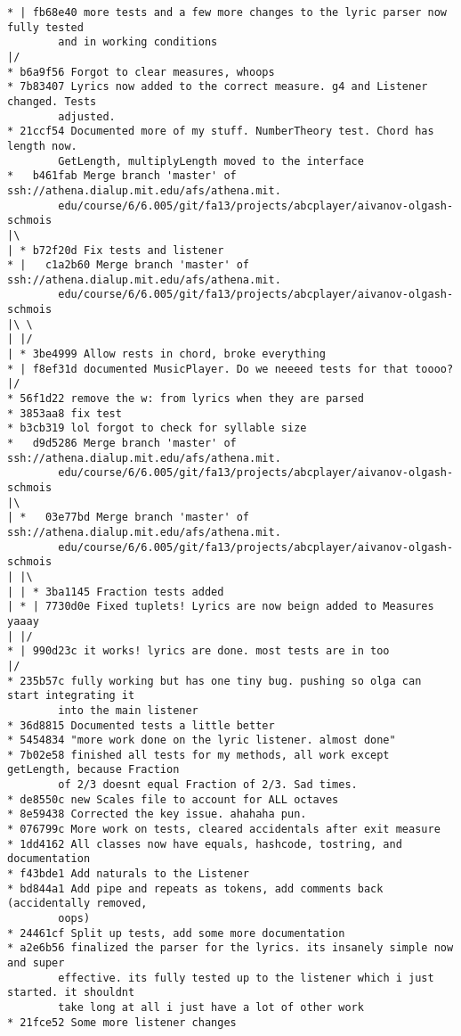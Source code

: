 \documentclass[12pt]{book}
\begin{document}
\begin{Verbatim}
* | fb68e40 more tests and a few more changes to the lyric parser now fully tested 
        and in working conditions
|/
* b6a9f56 Forgot to clear measures, whoops
* 7b83407 Lyrics now added to the correct measure. g4 and Listener changed. Tests 
        adjusted.
* 21ccf54 Documented more of my stuff. NumberTheory test. Chord has length now. 
        GetLength, multiplyLength moved to the interface
*   b461fab Merge branch 'master' of ssh://athena.dialup.mit.edu/afs/athena.mit.
        edu/course/6/6.005/git/fa13/projects/abcplayer/aivanov-olgash-schmois
|\
| * b72f20d Fix tests and listener
* |   c1a2b60 Merge branch 'master' of ssh://athena.dialup.mit.edu/afs/athena.mit.
        edu/course/6/6.005/git/fa13/projects/abcplayer/aivanov-olgash-schmois
|\ \
| |/
| * 3be4999 Allow rests in chord, broke everything
* | f8ef31d documented MusicPlayer. Do we neeeed tests for that toooo?
|/
* 56f1d22 remove the w: from lyrics when they are parsed
* 3853aa8 fix test
* b3cb319 lol forgot to check for syllable size
*   d9d5286 Merge branch 'master' of ssh://athena.dialup.mit.edu/afs/athena.mit.
        edu/course/6/6.005/git/fa13/projects/abcplayer/aivanov-olgash-schmois
|\
| *   03e77bd Merge branch 'master' of ssh://athena.dialup.mit.edu/afs/athena.mit.
        edu/course/6/6.005/git/fa13/projects/abcplayer/aivanov-olgash-schmois
| |\
| | * 3ba1145 Fraction tests added
| * | 7730d0e Fixed tuplets! Lyrics are now beign added to Measures yaaay
| |/
* | 990d23c it works! lyrics are done. most tests are in too
|/
* 235b57c fully working but has one tiny bug. pushing so olga can start integrating it 
        into the main listener
* 36d8815 Documented tests a little better
* 5454834 "more work done on the lyric listener. almost done"
* 7b02e58 finished all tests for my methods, all work except getLength, because Fraction 
        of 2/3 doesnt equal Fraction of 2/3. Sad times.
* de8550c new Scales file to account for ALL octaves
* 8e59438 Corrected the key issue. ahahaha pun.
* 076799c More work on tests, cleared accidentals after exit measure
* 1dd4162 All classes now have equals, hashcode, tostring, and documentation
* f43bde1 Add naturals to the Listener
* bd844a1 Add pipe and repeats as tokens, add comments back (accidentally removed, 
        oops)
* 24461cf Split up tests, add some more documentation
* a2e6b56 finalized the parser for the lyrics. its insanely simple now and super 
        effective. its fully tested up to the listener which i just started. it shouldnt 
        take long at all i just have a lot of other work
* 21fce52 Some more listener changes

\end{Verbatim}
\end{document}
